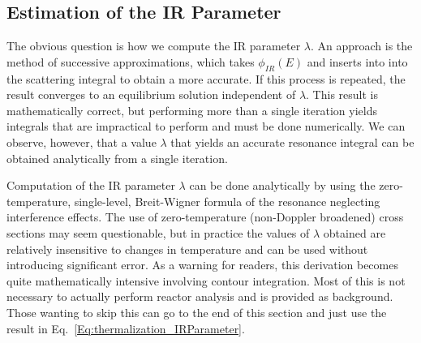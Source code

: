 \subsection{Estimation of the IR Parameter} %

The obvious question is how we compute the IR parameter $\lambda$. An approach is the method of successive approximations, which takes $\phi_{IR}(E)$ and inserts into into the scattering integral to obtain a more accurate. If this process is repeated, the result converges to an equilibrium solution independent of $\lambda$. This result is mathematically correct, but performing more than a single iteration yields integrals that are impractical to perform and must be done numerically. We can observe, however, that a value $\lambda$ that yields an accurate resonance integral can be obtained analytically from a single iteration.

Computation of the IR parameter $\lambda$ can be done analytically by using the zero-temperature, single-level, Breit-Wigner formula of the resonance neglecting interference effects. The use of zero-temperature (non-Doppler broadened) cross sections may seem questionable, but in practice the values of $\lambda$ obtained are relatively insensitive to changes in temperature and can be used without introducing significant error. As a warning for readers, this derivation becomes quite mathematically intensive involving contour integration. Most of this is not necessary to actually perform reactor analysis and is provided as background. Those wanting to skip this can go to the end of this section and just use the result in Eq.~\eqref{Eq:thermalization_IRParameter}.


